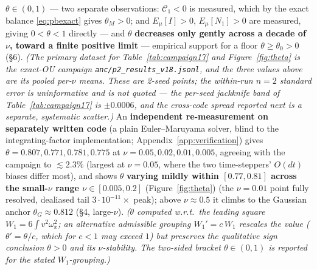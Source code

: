 \documentclass[11pt]{article}
\theoremstyle{remark}
\theoremstyle{plain}
\begin{document}
$\theta \in (0,1)$ --- two separate observations: $\mathcal{C}_1 < 0$ is measured,
which by the exact balance \eqref{eq:pbexact} gives $\theta_M > 0$; and
$E_\mu[I] > 0$, $E_\mu[N_1] > 0$ are measured, giving $0 < \theta < 1$ directly ---
and $\theta$
\textbf{decreases only gently across a decade of $\nu$, toward a finite positive limit} ---
empirical support for a floor $\theta \ge \theta_0 > 0$ (\S6). \emph{(The primary dataset
for Table~\ref{tab:campaign17} and Figure~\ref{fig:theta} is the exact-OU campaign
\texttt{anc/p2\_results\_v18.jsonl}, and the three values above are its pooled per-$\nu$
means. These are 2-seed points; the within-run $n=2$ standard error is uninformative and is
not quoted --- the per-seed jackknife band of Table~\ref{tab:campaign17} is $\pm0.0006$, and
the cross-code spread reported next is a separate, systematic scatter.)} An
\textbf{independent re-measurement on separately written code} (a plain Euler--Maruyama
solver, blind to the integrating-factor implementation; Appendix~\ref{app:verification}) gives
$\theta = 0.807, 0.771, 0.781, 0.775$ at
$\nu = 0.05, 0.02, 0.01, 0.005$, agreeing with the campaign to $\lesssim2.3\%$ (largest at
$\nu = 0.05$, where the two time-steppers' $O(dt)$ biases differ most), and shows $\theta$ \textbf{varying mildly within $[0.77, 0.81]$ across the small-$\nu$ range $\nu \in [0.005, 0.2]$} (Figure~\ref{fig:theta})
(the $\nu=0.01$ point fully resolved, dealiased tail $3\cdot10^{-11}\times$ peak); above
$\nu \approx 0.5$ it climbs to the Gaussian anchor $\theta_G \approx 0.812$ (\S4, large-$\nu$).
\emph{($\theta$ computed w.r.t.\ the leading square
$W_1 = 6\int v^2\omega_x^2$; an alternative admissible grouping $W_1' = c\,W_1$ rescales the value
($\theta' = \theta/c$, which for $c<1$ may exceed $1$) but preserves the qualitative sign
conclusion $\theta > 0$ and its $\nu$-stability. The two-sided bracket $\theta \in (0,1)$ is
reported for the stated $W_1$-grouping.)}
\end{document}
